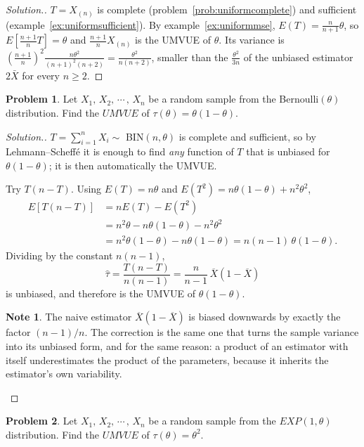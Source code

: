 \documentclass[12pt,a4paper]{report}
\theoremstyle{definition}
\newtheorem*{note}{Note}
\newtheorem{problemx}{Problem}[section]
\newenvironment{problem}{\begin{problemx}}{\end{problemx}}
\newenvironment{solution}
  {\renewcommand{\qedsymbol}{}\begin{proof}[\textit{Solution}.]}
  {\end{proof}}
\begin{document}
\begin{solution}
$T = X_{(n)}$ is complete (problem~\ref{prob:uniformcomplete}) and sufficient
(example~\ref{ex:uniformsufficient}). By example~\ref{ex:uniformmse},
$E(T) = \frac{n}{n + 1}\theta$, so $E\left[\frac{n + 1}{n}T\right] = \theta$ and
$\frac{n + 1}{n}X_{(n)}$ is the UMVUE of $\theta$. Its variance is
$\left(\frac{n + 1}{n}\right)^2\frac{n\theta^2}{(n + 1)^2(n + 2)} = \frac{\theta^2}{n(n + 2)}$,
smaller than the $\frac{\theta^2}{3n}$ of the unbiased estimator $2\bar X$ for every
$n\ge 2$.
\end{solution}

\begin{problem}
Let $X_1, \, X_2, \, \cdots\, , \, X_n$ be a random sample from the Bernoulli$(\theta)$ distribution. Find the $UMVUE$ of $\tau(\theta) = \theta(1 -\theta)$.
\end{problem}

\begin{solution}
$T=\sum_{i=1}^{n}X_i\sim$ BIN$(n,\theta)$ is complete and sufficient, so by
Lehmann--Scheff\'e it is enough to find \emph{any} function of $T$ that is
unbiased for $\theta(1-\theta)$; it is then automatically the UMVUE.

Try $T(n-T)$. Using $E(T)=n\theta$ and
$E\left(T^{2}\right)=n\theta(1-\theta)+n^{2}\theta^{2}$,
\begin{align*}
E\left[T(n-T)\right] &= nE(T) - E\left(T^{2}\right)\\
&= n^{2}\theta - n\theta(1-\theta) - n^{2}\theta^{2}\\
&= n^{2}\theta(1-\theta) - n\theta(1-\theta)
 = n(n-1)\,\theta(1-\theta).
\end{align*}
Dividing by the constant $n(n-1)$,
\[\widehat{\tau} = \frac{T(n-T)}{n(n-1)}
= \frac{n}{n-1}\,\overline{X}\left(1-\overline{X}\right)\]
is unbiased, and therefore is the UMVUE of $\theta(1-\theta)$.

\begin{note}
The naive estimator $\overline{X}\left(1-\overline{X}\right)$ is biased
downwards by exactly the factor $(n-1)/n$. The correction is the same one that
turns the sample variance into its unbiased form, and for the same reason: a
product of an estimator with itself underestimates the product of the
parameters, because it inherits the estimator's own variability.
\end{note}
\end{solution}

\begin{problem}
Let $X_1, \, X_2, \, \cdots\, , \, X_n$ be a random sample from the $EXP(1,\theta)$ distribution. Find the $UMVUE$ of $\tau(\theta) = \theta^2$.
\end{problem}
\end{document}
